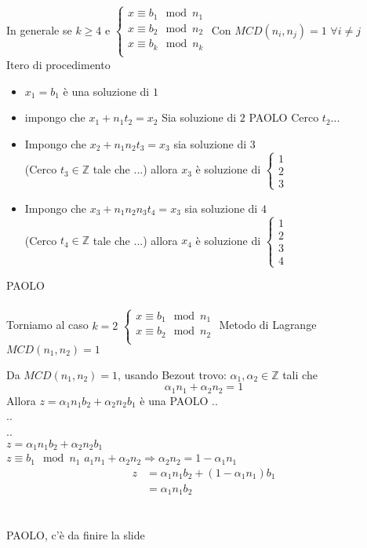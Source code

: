 In generale se $k\geq 4$ e
$
\begin{cases}
    x\equiv b_1\mod n_1\\
    x\equiv b_2\mod n_2\\
    x\equiv b_k\mod n_k\\
\end{cases}
$ Con $MCD(n_i,n_j)=1$ $\forall i\neq j $\\
Itero di procedimento 
\begin{itemize}
    \item $x_1=b_1 $ è una soluzione di $1$
    \item impongo che $x_1+n_1t_2=x_2$ Sia soluzione di $2$
        {\color{purple}PAOLO} Cerco $t_2$...
    \item Impongo che  $x_2+n_1n_2t_3=x_3$ sia soluzione di $3$\\
        (Cerco $t_3\in\mathbb{Z}$ tale che ...) allora $x_3$ è soluzione di 
        $\begin{cases}
            1\\2\\3
        \end{cases}$
    \item Impongo che  $x_3+n_1n_2n_3t_4=x_3$ sia soluzione di $4$\\
        (Cerco $t_4\in\mathbb{Z}$ tale che ...) allora $x_4$ è soluzione di 
        $\begin{cases}
            1\\2\\3\\4
        \end{cases}$
\end{itemize}
{\color{purple} PAOLO}\\\\

Torniamo al caso $k=2$
$    \begin{cases}
    x\equiv b_1\mod n_1\\
    x\equiv b_2\mod n_2\\
\end{cases}$
Metodo di Lagrange $MCD(n_1,n_2)=1$

Da $MCD(n_1,n_2)=1$, usando Bezout trovo:
$\alpha_1, \alpha_2\in\mathbb{Z}$ tali che 
$$\alpha_1n_1+\alpha_2n_2=1$$
Allora $z=\alpha_1n_1b_2+\alpha_2n_2b_1$ è una {\color{purple}PAOLO}
..\\
..\\
..\\    
$z=\alpha_1n_1b_2+\alpha_2n_2b_1$\\
$z\equiv b_1\mod n_1$
$a_1n_1+\alpha_2n_2\Longrightarrow \alpha_2n_2=1-\alpha_1n_1$
\begin{align} 
    z&=\alpha_1n_1b_2+(1-\alpha_1n_1)b_1\\
     &=\alpha_1n_1b_2
\end{align} 
{\color{purple} \\\\PAOLO, c'è da finire la slide\\\\}


